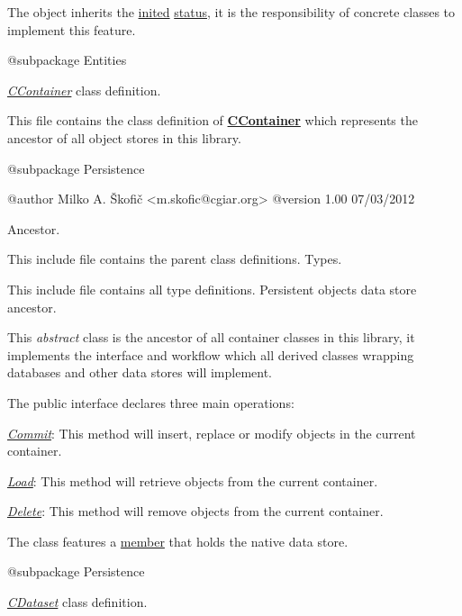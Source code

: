 The object inherits the \hyperlink{}{inited} \hyperlink{}{status}, it is the responsibility of concrete classes to implement this feature.

\begin{DoxyVerb} @subpackage        Entities\end{DoxyVerb}


{\itshape \hyperlink{class_c_container}{C\-Container}} class definition.

This file contains the class definition of {\bfseries \hyperlink{class_c_container}{C\-Container}} which represents the ancestor of all object stores in this library.

\begin{DoxyVerb} @subpackage        Persistence

 @author            Milko A. Škofič <m.skofic@cgiar.org>
 @version   1.00 07/03/2012\end{DoxyVerb}


Ancestor.

This include file contains the parent class definitions. Types.

This include file contains all type definitions. Persistent objects data store ancestor.

This {\itshape abstract} class is the ancestor of all container classes in this library, it implements the interface and workflow which all derived classes wrapping databases and other data stores will implement.

The public interface declares three main operations\-:


\begin{DoxyItemize}
\item {\itshape \hyperlink{}{Commit}}\-: This method will insert, replace or modify objects in the current container. 
\item {\itshape \hyperlink{}{Load}}\-: This method will retrieve objects from the current container. 
\item {\itshape \hyperlink{}{Delete}}\-: This method will remove objects from the current container. 
\end{DoxyItemize}

The class features a \hyperlink{}{member} that holds the native data store.

\begin{DoxyVerb} @subpackage        Persistence\end{DoxyVerb}


{\itshape \hyperlink{class_c_dataset}{C\-Dataset}} class definition.

